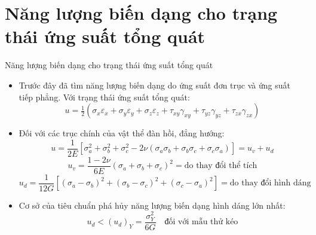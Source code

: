 \documentclass[aspectratio=169]{beamer}
\begin{document}
\section{Năng lượng biến dạng cho trạng thái ứng suất tổng quát}
\begin{frame}[t]{Năng lượng biến dạng cho trạng thái ứng suất tổng quát}
  \small
  \begin{itemize}
    \setlength{\itemsep}{0.5em}
    \item Trước đây đã tìm năng lượng biến dạng do ứng suất đơn trục và ứng suất
          tiếp phẳng. Với trạng thái ứng suất tổng quát:
    \[
      u = \tfrac{1}{2}\left(\sigma_x\varepsilon_x + \sigma_y\varepsilon_y
        + \sigma_z\varepsilon_z + \tau_{xy}\gamma_{xy} + \tau_{yz}\gamma_{yz}
        + \tau_{zx}\gamma_{zx}\right)
    \]
    \item Đối với các trục chính của vật thể đàn hồi, đẳng hướng:
    \[
      u = \frac{1}{2E}\left[\sigma_a^2 + \sigma_b^2 + \sigma_c^2
        - 2\nu(\sigma_a\sigma_b + \sigma_b\sigma_c + \sigma_c\sigma_a)\right]
        = u_v + u_d
    \]
    \[
      u_v = \frac{1 - 2\nu}{6E}(\sigma_a + \sigma_b + \sigma_c)^2
        = \text{do thay đổi thể tích}
    \]
    \[
      u_d = \frac{1}{12G}\left[(\sigma_a - \sigma_b)^2 + (\sigma_b - \sigma_c)^2
        + (\sigma_c - \sigma_a)^2\right] = \text{do thay đổi hình dáng}
    \]
    \item Cơ sở của tiêu chuẩn phá hủy năng lượng biến dạng hình dáng lớn nhất:
    \[
      u_d < (u_d)_Y = \frac{\sigma_Y^2}{6G} \quad\text{đối với mẫu thử kéo}
    \]
  \end{itemize}
\end{frame}
\end{document}
